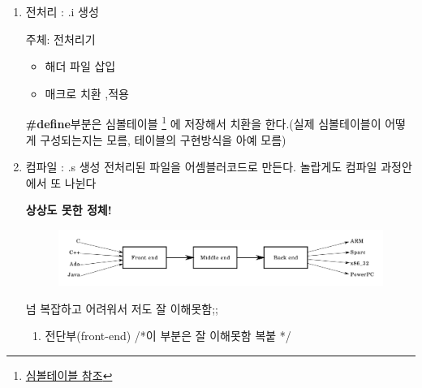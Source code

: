 \documentclass{oblivoir}
\begin{document}
\begin{enumerate}
    \item 전처리 : .i 생성
    
    주체: 전처리기
    \begin{itemize}
        \item  해더 파일 삽입
        \item 매크로 치환 ,적용
    \end{itemize}
    \textbf{\#define}부분은 심볼테이블
    \footnote{\href{https://en.wikipedia.org/wiki/Symbol_table}{심볼테이블 참조}}
    에 저장해서 치환을 한다.(실제 심볼테이블이 어떻게 구성되는지는 모름, 테이블의 구현방식을 아예 모름)
    
    \item 컴파일 : .s 생성 전처리된 파일을 어셈블러코드로 만든다. 
    놀랍게도 컴파일 과정안에서 또 나뉜다

    \textbf{상상도 못한 정체!}

    \begin{figure}[h!]
        \centering
        \includegraphics[scale = 0.3]{compiler.png}
    \end{figure}

    넘 복잡하고 어려워서 저도 잘 이해못함;;

    \begin{enumerate}
        \item 전단부(front-end) /*이 부분은 잘 이해못함 복붙 */ 
        

\end{enumerate}
\end{enumerate}
\end{document}
